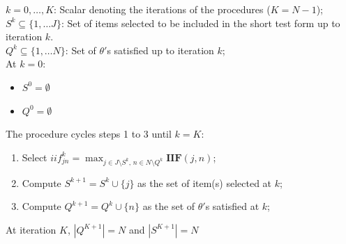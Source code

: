 \documentclass[aspectratio=149, compress]{beamer}
\begin{document}
\begin{frame}
	
	\small
	$k = 0, \ldots, K$: Scalar denoting the iterations of the procedures ($K = N-1$);\\ 
	$S^k \subseteq \{1, \ldots J\}$: Set of items selected to be included in the short test form up to iteration $k$.\\
	$Q^k \subseteq \{1, \ldots N\}$: Set of $\theta'$s satisfied up to iteration $k$;\\
	
	\vspace{1.5mm}
	\pause
	At $k=0$: 
	
	\vspace{1.5mm}
	\begin{itemize}
		\item $S^0 = \emptyset$
		\item $Q^0 = \emptyset$
	\end{itemize}
	
	The procedure cycles steps 1 to 3 until $k = K$:
	
	\begin{enumerate}
		\item Select $iif_{jn}^k = \displaystyle  \max_{j \in J\setminus S^k, \, n  \in N \setminus Q^k} \mathbf{IIF}(j,n)$;
		\item Compute $S^{k+1} = S^k \cup \{j\}$ as the set of item(s) selected at $k$; 
		\item Compute $Q^{k+1} = Q^k \cup \{n\}$ as the set of $\theta'$s satisfied at $k$; 
	\end{enumerate}
	\vspace{1.5mm}
	
	At iteration $K$, $|Q^{K + 1}| = N$ and   $|S^{K + 1}| = N$ 
	
\end{frame}
\end{document}
